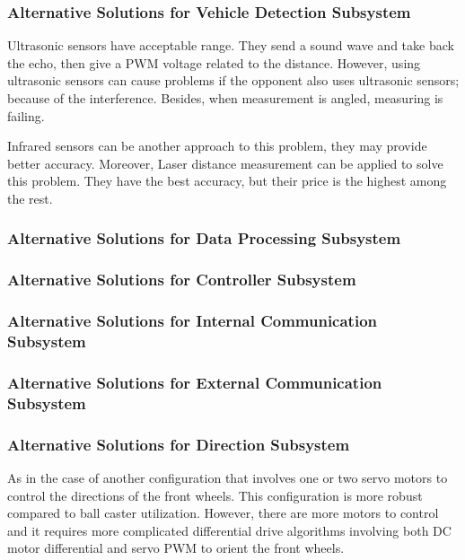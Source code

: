 \documentclass[a4paper,12pt]{article}
\begin{document}
	
		\subsubsection{Alternative Solutions for Vehicle Detection Subsystem}
		
			Ultrasonic sensors have acceptable range. They send a sound wave and take back the echo, then give a PWM voltage related to the distance. However, using ultrasonic sensors can cause problems if the opponent also uses ultrasonic sensors; because of the interference. Besides, when measurement is angled, measuring is failing. 

		Infrared sensors can be another approach to this problem, they may provide better accuracy. Moreover, Laser distance measurement can be applied to solve this problem. They have the best accuracy, but their price is the highest among the rest.
	
		\subsubsection{Alternative Solutions for Data Processing Subsystem}
			
		\subsubsection{Alternative Solutions for Controller Subsystem}
			
		
		\subsubsection{Alternative Solutions for Internal Communication Subsystem}
		
		\subsubsection{Alternative Solutions for External Communication Subsystem}
		
		\subsubsection{Alternative Solutions for Direction Subsystem}
		
			As in the case of another configuration that involves one or two servo motors to control the directions of the front wheels. This configuration is more robust compared to ball caster utilization. However, there are more motors to control and it requires more complicated differential drive algorithms involving both DC motor differential and servo PWM to orient the front wheels.
			
\end{document}
